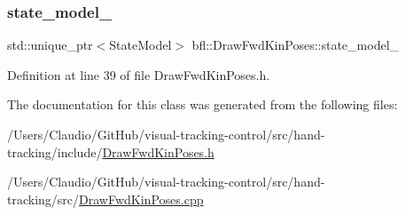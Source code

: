 \subsubsection{\texorpdfstring{state\+\_\+model\+\_\+}{state\_model\_}}
{\footnotesize\ttfamily std\+::unique\+\_\+ptr$<$State\+Model$>$ bfl\+::\+Draw\+Fwd\+Kin\+Poses\+::state\+\_\+model\+\_\+\hspace{0.3cm}{\ttfamily [protected]}}



Definition at line 39 of file Draw\+Fwd\+Kin\+Poses.\+h.



The documentation for this class was generated from the following files\+:\begin{DoxyCompactItemize}
\item 
/\+Users/\+Claudio/\+Git\+Hub/visual-\/tracking-\/control/src/hand-\/tracking/include/\hyperlink{DrawFwdKinPoses_8h}{Draw\+Fwd\+Kin\+Poses.\+h}\item 
/\+Users/\+Claudio/\+Git\+Hub/visual-\/tracking-\/control/src/hand-\/tracking/src/\hyperlink{DrawFwdKinPoses_8cpp}{Draw\+Fwd\+Kin\+Poses.\+cpp}\end{DoxyCompactItemize}
